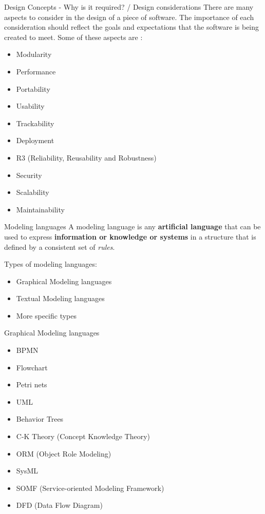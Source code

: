\documentclass[slidetop,mathserif,red]{beamer}
\begin{document}
\begin{frame}{Design Concepts - Why is it required? / Design considerations}
There are many aspects to consider in the design of a piece of software. The importance of each consideration should reflect the goals and expectations that the software is being created to meet. Some of these aspects are \cite{b3}: 
\begin{itemize}
	\item Modularity
	\item Performance
	\item Portability
	\item Usability
	\item Trackability
	\item Deployment
	\item R3 (Reliability, Reusability and Robustness)
	\item Security
	\item Scalability
	\item Maintainability 
\end{itemize}
\end{frame}


\begin{frame}{Modeling languages}
A modeling language is any \textbf{artificial language} that can be used to express \textbf{information or knowledge or systems} in a structure that is defined by a consistent set of \textit{rules}.

Types of modeling languages:
\begin{itemize}
	\item Graphical Modeling languages
	\item Textual Modeling languages
	\item More specific types
\end{itemize}

\end{frame}

\begin{frame}{Graphical Modeling languages}
\begin{itemize}
		\item BPMN
		\item Flowchart
		\item Petri nets
		\item UML
		\item Behavior Trees
		\item C-K Theory (Concept Knowledge Theory)
		\item ORM (Object Role Modeling)
		\item SysML
		\item SOMF (Service-oriented Modeling Framework)
		\item DFD (Data Flow Diagram)
\end{itemize}
\end{frame}
\end{document}
